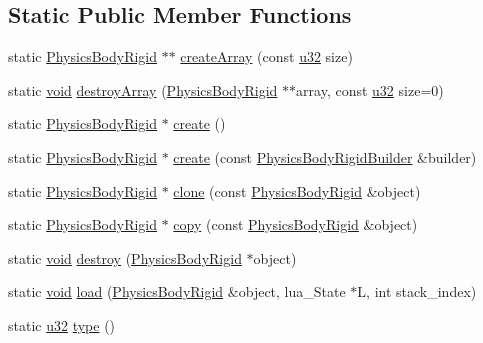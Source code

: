 \subsection*{Static Public Member Functions}
\begin{DoxyCompactItemize}
\item 
static \mbox{\hyperlink{classnjli_1_1_physics_body_rigid}{Physics\+Body\+Rigid}} $\ast$$\ast$ \mbox{\hyperlink{classnjli_1_1_physics_body_rigid_a26ae91f4189d4e858907035bbd485967}{create\+Array}} (const \mbox{\hyperlink{_util_8h_a10e94b422ef0c20dcdec20d31a1f5049}{u32}} size)
\item 
static \mbox{\hyperlink{_thread_8h_af1e856da2e658414cb2456cb6f7ebc66}{void}} \mbox{\hyperlink{classnjli_1_1_physics_body_rigid_aa7454c3658a28f869dbcc5d6c0386673}{destroy\+Array}} (\mbox{\hyperlink{classnjli_1_1_physics_body_rigid}{Physics\+Body\+Rigid}} $\ast$$\ast$array, const \mbox{\hyperlink{_util_8h_a10e94b422ef0c20dcdec20d31a1f5049}{u32}} size=0)
\item 
static \mbox{\hyperlink{classnjli_1_1_physics_body_rigid}{Physics\+Body\+Rigid}} $\ast$ \mbox{\hyperlink{classnjli_1_1_physics_body_rigid_a9cb801c257f66cf5c58dea67b10115e6}{create}} ()
\item 
static \mbox{\hyperlink{classnjli_1_1_physics_body_rigid}{Physics\+Body\+Rigid}} $\ast$ \mbox{\hyperlink{classnjli_1_1_physics_body_rigid_a701d02af43bfc3c058252d907b7a091c}{create}} (const \mbox{\hyperlink{classnjli_1_1_physics_body_rigid_builder}{Physics\+Body\+Rigid\+Builder}} \&builder)
\item 
static \mbox{\hyperlink{classnjli_1_1_physics_body_rigid}{Physics\+Body\+Rigid}} $\ast$ \mbox{\hyperlink{classnjli_1_1_physics_body_rigid_a2ea6d80ad8df71463cfe0b2c3c627b4c}{clone}} (const \mbox{\hyperlink{classnjli_1_1_physics_body_rigid}{Physics\+Body\+Rigid}} \&object)
\item 
static \mbox{\hyperlink{classnjli_1_1_physics_body_rigid}{Physics\+Body\+Rigid}} $\ast$ \mbox{\hyperlink{classnjli_1_1_physics_body_rigid_a7e1f73eba8cbf9860638b600f292eaee}{copy}} (const \mbox{\hyperlink{classnjli_1_1_physics_body_rigid}{Physics\+Body\+Rigid}} \&object)
\item 
static \mbox{\hyperlink{_thread_8h_af1e856da2e658414cb2456cb6f7ebc66}{void}} \mbox{\hyperlink{classnjli_1_1_physics_body_rigid_a537eeedf7da62318ae0d3a2d076b5fd4}{destroy}} (\mbox{\hyperlink{classnjli_1_1_physics_body_rigid}{Physics\+Body\+Rigid}} $\ast$object)
\item 
static \mbox{\hyperlink{_thread_8h_af1e856da2e658414cb2456cb6f7ebc66}{void}} \mbox{\hyperlink{classnjli_1_1_physics_body_rigid_af57a409d8e39b06aa74c0c742fe6ff22}{load}} (\mbox{\hyperlink{classnjli_1_1_physics_body_rigid}{Physics\+Body\+Rigid}} \&object, lua\+\_\+\+State $\ast$L, int stack\+\_\+index)
\item 
static \mbox{\hyperlink{_util_8h_a10e94b422ef0c20dcdec20d31a1f5049}{u32}} \mbox{\hyperlink{classnjli_1_1_physics_body_rigid_a99dba252410763fe9ac82424321add06}{type}} ()
\end{DoxyCompactItemize}
